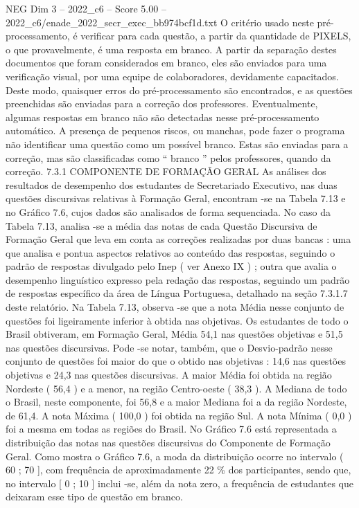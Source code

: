 \begin{textsample}{NEG Dim 3 – 2022\_c6 – Score 5.00 – 2022\_c6/enade\_2022\_secr\_exec\_bb974bcf1d.txt}
O critério usado neste pré-processamento, é verificar para cada questão, a partir da quantidade de PIXELS, o que provavelmente, é uma resposta em branco.
A partir da separação destes documentos que foram considerados em branco, eles são enviados para uma verificação visual, por uma equipe de colaboradores, devidamente capacitados.
Deste modo, quaisquer erros do pré-processamento são encontrados, e as questões preenchidas são enviadas para a correção dos professores.
Eventualmente, algumas respostas em branco não são detectadas nesse pré-processamento automático.
A presença de pequenos riscos, ou manchas, pode fazer o programa não identificar uma questão como um possível branco.
Estas são enviadas para a correção, mas são classificadas como “ branco ” pelos professores, quando da correção. 7.3.1 COMPONENTE DE FORMAÇÃO GERAL As análises dos resultados de desempenho dos estudantes de Secretariado Executivo, nas duas questões discursivas relativas à Formação Geral, encontram -se na Tabela 7.13 e no Gráfico 7.6, cujos dados são analisados de forma sequenciada.
No caso da Tabela 7.13, analisa -se a média das notas de cada Questão Discursiva de Formação Geral que leva em conta as correções realizadas por duas bancas : uma que analisa e pontua aspectos relativos ao conteúdo das respostas, seguindo o padrão de respostas divulgado pelo Inep ( ver Anexo IX ) ; outra que avalia o desempenho linguístico expresso pela redação das respostas, seguindo um padrão de respostas específico da área de Língua Portuguesa, detalhado na seção 7.3.1.7 deste relatório.
Na Tabela 7.13, observa -se que a nota Média nesse conjunto de questões foi ligeiramente inferior à obtida nas objetivas.
Os estudantes de todo o Brasil obtiveram, em Formação Geral, Média 54,1 nas questões objetivas e 51,5 nas questões discursivas.
Pode -se notar, também, que o Desvio-padrão nesse conjunto de questões foi maior do que o obtido nas objetivas : 14,6 nas questões objetivas e 24,3 nas questões discursivas.
A maior Média foi obtida na região Nordeste ( 56,4 ) e a menor, na região Centro-oeste ( 38,3 ).
A Mediana de todo o Brasil, neste componente, foi 56,8 e a maior Mediana foi a da região Nordeste, de 61,4.
A nota Máxima ( 100,0 ) foi obtida na região Sul.
A nota Mínima ( 0,0 ) foi a mesma em todas as regiões do Brasil.
No Gráfico 7.6 está representada a distribuição das notas nas questões discursivas do Componente de Formação Geral.
Como mostra o Gráfico 7.6, a moda da distribuição ocorre no intervalo ( 60 ; 70 ], com frequência de aproximadamente 22 \% dos participantes, sendo que, no intervalo [ 0 ; 10 ] inclui -se, além da nota zero, a frequência de estudantes que deixaram esse tipo de questão em branco.

\end{textsample}
